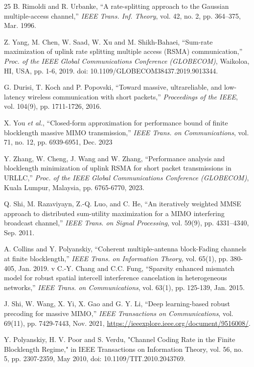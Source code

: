 \documentclass[a4paper, 12pt, onecolumn, journal, twoside, draftclsnofoot]{IEEEtran}
\begin{document}
\newpage
\begin{thebibliography}{25} 
B. Rimoldi and R. Urbanke, ``A rate-splitting approach to the Gaussian multiple-access channel,'' \emph{IEEE Trans. Inf. Theory},  vol. 42, no. 2, pp. 364–375, Mar. 1996.

Z. Yang, M. Chen, W. Saad, W. Xu and M. Shikh-Bahaei, ``Sum-rate maximization of uplink rate splitting multiple access (RSMA) communication,'' \emph{Proc. of the IEEE Global Communications Conference (GLOBECOM)}, Waikoloa, HI, USA, pp. 1-6, 2019.  doi: 10.1109/GLOBECOM38437.2019.9013344.

G. Durisi, T. Koch and P. Popovski, ``Toward massive, ultrareliable, and low-latency wireless communication with short packets,'' \emph{Proceedings of the IEEE}, vol. 104(9), pp. 1711-1726, 2016.

X. You \emph{et al.}, ``Closed-form approximation for performance bound of finite blocklength massive MIMO transmission,'' \emph{IEEE Trans. on Communications}, vol. 71, no. 12, pp. 6939-6951, Dec. 2023

Y. Zhang, W. Cheng, J. Wang and W. Zhang, ``Performance analysis and blocklength minimization of uplink RSMA for short packet transmissions in URLLC,'' \emph{Proc. of the IEEE Global Communications Conference (GLOBECOM)}, Kuala Lumpur, Malaysia, pp. 6765-6770, 2023.

Q. Shi, M. Razaviyayn, Z.-Q. Luo, and C. He, ``An iteratively weighted MMSE approach to distributed sum-utility maximization for a MIMO interfering broadcast channel,'' \emph{IEEE Trans. on Signal Processing}, vol. 59(9), pp. 4331–4340, Sep. 2011.

A. Collins and Y. Polyanskiy, ``Coherent multiple-antenna block-Fading channels at finite blocklength,'' \emph{IEEE Trans. on Information Theory,} vol. 65(1), pp. 380-405, Jan. 2019.
v
C.-Y. Chang and C.C. Fung, ``Sparsity enhanced mismatch model for robust spatial intercell interference cancelation in heterogeneous networks,'' \emph{IEEE Trans. on Communications}, vol. 63(1), pp. 125-139, Jan. 2015.

J. Shi, W. Wang, X. Yi, X. Gao and G. Y. Li, ``Deep learning-based robust precoding for massive MIMO,'' \emph{IEEE Transactions on Communications}, vol. 69(11), pp. 7429-7443, Nov. 2021, \href{https://ieeexplore.ieee.org/document/9516008/}{https://ieeexplore.ieee.org/document/9516008/}.

Y. Polyanskiy, H. V. Poor and S. Verdu, "Channel Coding Rate in the Finite Blocklength Regime," in IEEE Transactions on Information Theory, vol. 56, no. 5, pp. 2307-2359, May 2010, doi: 10.1109/TIT.2010.2043769.



\end{thebibliography}
\end{document}
